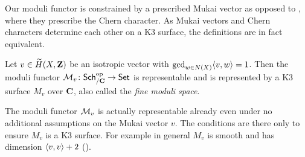 \begin{remark}
    Our moduli functor is constrained by a prescribed Mukai vector as opposed to \cite[\S 4.2, Proposition 4.15]{vanBree2020}, where they prescribe the Chern character. As Mukai vectors and Chern characters determine each other on a K3 surface, the definitions are in fact equivalent. 
\end{remark}

\begin{theorem}
    \label{Representability of moduli functor}
    Let $v \in \widetilde{H}(X, \mathbf Z)$ be an isotropic vector with $\gcd_{w \in N(X)}\langle v, w \rangle = 1$. Then the moduli functor $\mathcal M_v \colon \mathsf{Sch}_{/\mathbf C}^{\text{op}} \to \mathsf{Set}$ is representable and is represented by a K3 surface $M_v$ over $\mathbf C$, also called the \emph{fine moduli space}.
\end{theorem}


\begin{remark}
    The moduli functor $\mathcal M_v$ is actually representable already even under no additional assumptions on the Mukai vector $v$. The conditions are there only to ensure $M_v$ is a K3 surface. For example in general $M_v$ is smooth and has dimension $\langle v, v \rangle + 2$ (\cf \cite[\S 4.3, Propositon 4.20]{vanBree2020}).
\end{remark}

